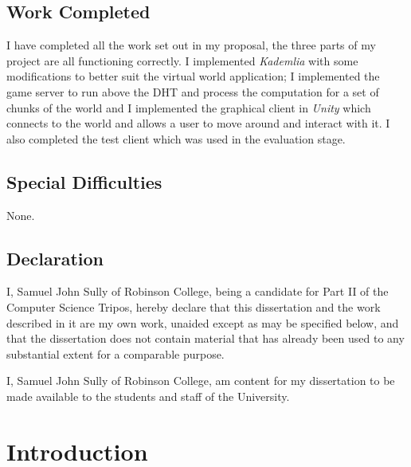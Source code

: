 \documentclass[10pt,twoside,notitlepage,a4paper]{report}
\newcommand{\unity}{\emph{Unity}}
\newcommand{\kademlia}{\emph{Kademlia}}
\begin{document}
	\section*{Work Completed}
	I have completed all the work set out in my proposal, the three parts of my project are all functioning correctly. I implemented \kademlia{} with some modifications to better suit the virtual world application; I implemented the game server to run above the DHT and process the computation for a set of chunks of the world and I implemented the graphical client in \unity{} which connects to the world and allows a user to move around and interact with it. I also completed the test client which was used in the evaluation stage.
	
	\section*{Special Difficulties}
	None.
	
	\newpage
	\section*{Declaration}
	
	I, Samuel John Sully of Robinson College, being a candidate for Part II of the Computer
	Science Tripos, hereby declare that this dissertation and the work described in it are
	my own work, unaided except as may be specified below, and that the dissertation does
	not contain material that has already been used to any substantial extent for a comparable
	purpose.
	
	\bigskip
	
	\noindent I, Samuel John Sully of Robinson College, am content for my dissertation to be made available to the students and staff of the University.
	
	\cleardoublepage
	
	\tableofcontents
	
	\listoffigures
	
	\listoftables
	
	\listofalgorithms
	
	\newpage

	\cleardoublepage
	
	\setcounter{page}{1}
	\pagestyle{headings}
	\chapter{Introduction}
	
\end{document}
